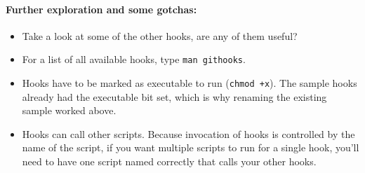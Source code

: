 \documentclass{article}
\begin{document}
\paragraph{Further exploration and some gotchas:}
\begin{itemize}
  \item Take a look at some of the other hooks, are any of them useful?
  \item For a list of all available hooks, type \texttt{man githooks}.
  \item Hooks have to be marked as executable to run (\texttt{chmod +x}). The
    sample hooks already had the executable bit set, which is why renaming the
    existing sample worked above.
  \item Hooks can call other scripts. Because invocation of hooks is
    controlled by the name of the script, if you want multiple scripts to run
    for a single hook, you'll need to have one script named correctly that
    calls your other hooks.
\end{itemize}
\end{document}
